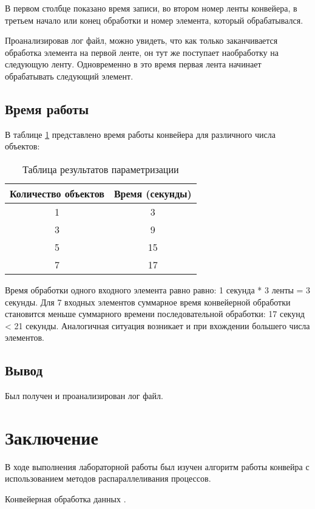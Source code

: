 \documentclass[a4paper, 14pt]{article}
\begin{document}
В первом столбце показано время записи, во втором номер ленты конвейера, в третьем начало или конец обработки и номер элемента, который обрабатывался.

Проанализировав лог файл, можно увидеть, что как только заканчивается обработка элемента на первой ленте, он тут же поступает наобработку на следующую ленту. Одновременно в это время первая лента начинает обрабатывать следующий элемент.

\subsection{Время работы}

В таблице \ref{tab:par} представлено время работы конвейера для различного числа объектов:
	
\begin{table}[H]
        \caption{Таблица результатов параметризации}
            \begin{tabular}{ | c | c | }
                \hline
                 Количество объектов  &  Время (секунды)\\
                 \hline  
1 &  3 \\
3 &  9 \\
5 & 15\\
7 & 17 \\
                \hline
            \end{tabular}
        \label{tab:par}
    \end{table} 
    
    Время обработки одного входного элемента равно равно: 
    1 секунда * 3 ленты = 3 секунды.
    Для 7 входных элементов суммарное время конвейерной обработки становится меньше суммарного времени последовательной обработки: 17 секунд < 21 секунды. Аналогичная ситуация возникает и при вхождении большего числа элементов.

	\subsection{Вывод}
	
	Был получен и проанализирован лог файл.

	\newpage
	\section*{Заключение}
	
	
	В ходе выполнения лабораторной работы был изучен алгоритм работы конвейра с использованием методов распараллеливания процессов.
	

\newpage
\begin{thebibliography}{}
      Конвейерная обработка данных .

\end{thebibliography}
\end{document}
